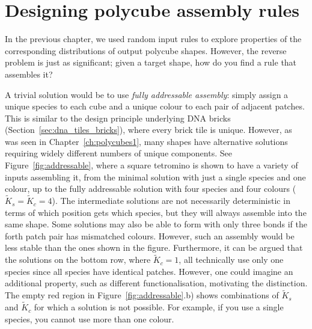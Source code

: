 \chapter{\label{ch:polycubes2}Designing polycube assembly rules}

\minitoc

In the previous chapter, we used random input rules to explore properties of the corresponding distributions of output polycube shapes. However, the reverse problem is just as significant; given a target shape, how do you find a rule that assembles it?  


A trivial solution would be to use \emph{fully addressable assembly}: simply assign a unique species to each cube and a unique colour to each pair of adjacent patches. This is similar to the design principle underlying DNA bricks (Section~\ref{sec:dna_tiles_bricks}), where every brick tile is unique. However, as was seen in Chapter~\ref{ch:polycubes1}, many shapes have alternative solutions requiring widely different numbers of unique components. See Figure~\ref{fig:addressable}, where a square tetromino is shown to have a variety of inputs assembling it, from the minimal solution with just a single species and one colour, up to the fully addressable solution with four species and four colours (\(\widetilde{K}_s = \widetilde{K}_c = 4\)). The intermediate solutions are not necessarily deterministic in terms of which position gets which species, but they will always assemble into the same shape. Some solutions may also be able to form with only three bonds if the forth patch pair has mismatched colours. However, such an assembly would be less stable than the ones shown in the figure. Furthermore, it can be argued that the solutions on the bottom row, where \(\widetilde{K}_c=1\), all technically use only one species since all species have identical patches. However, one could imagine an additional property, such as different functionalisation, motivating the distinction. The empty red region in Figure~\ref{fig:addressable}.b) shows combinations of \(\widetilde{K}_s\) and \(\widetilde{K}_c\) for which a solution is not possible. For example, if you use a single species, you cannot use more than one colour.

